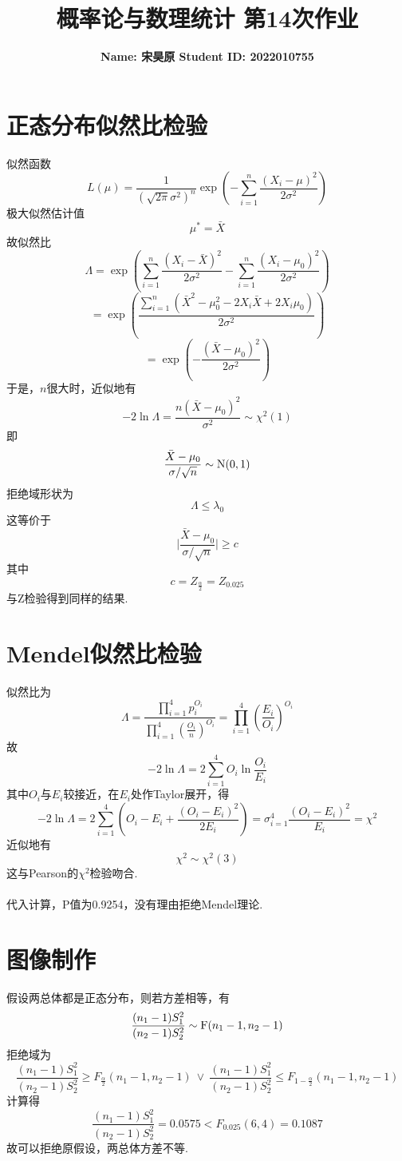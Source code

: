 \documentclass{article}
\title{\bf\Large  概率论与数理统计 第14次作业}
\author{\bf Name: 宋昊原 \qquad Student ID: 2022010755}
\begin{document}
\begin{CJK}{UTF8}{gbsn}
\maketitle
\section{正态分布似然比检验}
似然函数
$$ L(\mu)=\frac{1}{(\sqrt{2\pi}\sigma^{2})^{n}}\exp(-\sum\limits_{i=1}^{n}\frac{(X_{i}-\mu)^{2}}{2\sigma^{2}}) $$
极大似然估计值
$$ \mu^{*}=\bar{X}$$
故似然比
$$ \Lambda=\exp(\sum\limits_{i=1}^{n}\frac{(X_{i}-\bar{X})^{2}}{2\sigma^{2}}-\sum\limits_{i=1}^{n}\frac{(X_{i}-\mu_{0})^{2}}{2\sigma^{2}})$$
$$ =\exp(\frac{\sum\limits_{i=1}^{n}(\bar{X}^{2}-\mu_{0}^{2}-2X_{i}\bar{X}+2X_{i}\mu_{0})}{2\sigma^{2}})$$
$$ =\exp(-\frac{(\bar{X}-\mu_{0})^{2}}{2\sigma^{2}})$$
于是，$n$很大时，近似地有
$$ -2\ln\Lambda = \frac{n(\bar{X}-\mu_{0})^{2}}{\sigma^{2}}\sim\chi^{2}(1)$$
即
$$ \frac{\bar{X}-\mu_{0}}{\sigma/\sqrt{n}}\sim{\rm N}(0,1)$$
拒绝域形状为
$$ \Lambda\leq\lambda_{0} $$
这等价于
$$ \vert\frac{\bar{X}-\mu_{0}}{\sigma/\sqrt{n}}\vert\geq c $$
其中
$$ c=Z_{\frac{\alpha}{2}}=Z_{0.025} $$
与Z检验得到同样的结果.
\section{Mendel似然比检验}
似然比为
$$\Lambda=\frac{\prod\limits_{i=1}^{4}p_{i}^{O_{i}}}{\prod\limits_{i=1}^{4}(\frac{O_{i}}{n})^{O_{i}}}=\prod\limits_{i=1}^{4}(\frac{E_{i}}{O_{i}})^{O_{i}}$$
故
$$ -2\ln\Lambda=2\sum\limits_{i=1}^{4}O_{i}\ln\frac{O_{i}}{E_{i}}$$
其中$O_{i}$与$E_{i}$较接近，在$E_{i}$处作Taylor展开，得
$$ -2\ln\Lambda=2\sum\limits_{i=1}^{4}(O_{i}-E_{i}+\frac{(O_{i}-E_{i})^{2}}{2E_{i}})=\sigma_{i=1}^{4}\frac{(O_{i}-E_{i})^{2}}{E_{i}}=\chi^{2}$$
近似地有
$$ \chi^{2}\sim\chi^{2}(3)$$
这与Pearson的$\chi^{2}$检验吻合.
\\\\代入计算，P值为0.9254，没有理由拒绝Mendel理论.
\section{图像制作}
假设两总体都是正态分布，则若方差相等，有
$$ \frac{(n_{1}-1)S_{1}^{2}}{(n_{2}-1)S_{2}^{2}}\sim{\rm F}(n_{1}-1,n_{2}-1)$$
拒绝域为
$$ \frac{(n_{1}-1)S_{1}^{2}}{(n_{2}-1)S_{2}^{2}}\geq F_{\frac{\alpha}{2}}(n_{1}-1,n_{2}-1)\ \lor\ \frac{(n_{1}-1)S_{1}^{2}}{(n_{2}-1)S_{2}^{2}}\leq F_{1-\frac{\alpha}{2}}(n_{1}-1,n_{2}-1)$$
计算得
$$ \frac{(n_{1}-1)S_{1}^{2}}{(n_{2}-1)S_{2}^{2}}=0.0575 < F_{0.025}(6,4)=0.1087$$
故可以拒绝原假设，两总体方差不等.

\end{CJK}
\end{document}
